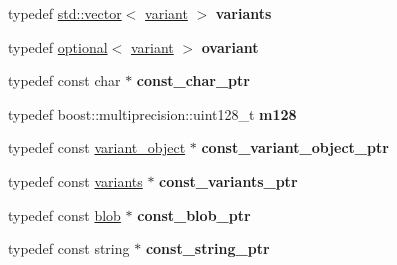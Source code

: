 \begin{DoxyCompactItemize}
\item 
\mbox{\label{namespacefc_a2e5e6bdb302dfb79e684336f3fbbd8bc}} 
typedef \mbox{\hyperlink{classstd_1_1vector}{std\+::vector}}$<$ \mbox{\hyperlink{classfc_1_1variant}{variant}} $>$ {\bfseries variants}
\item 
\mbox{\label{namespacefc_a19fe720f3bd477ddabfa64af0197880b}} 
typedef \mbox{\hyperlink{classfc_1_1optional}{optional}}$<$ \mbox{\hyperlink{classfc_1_1variant}{variant}} $>$ {\bfseries ovariant}
\item 
\mbox{\label{namespacefc_a0640ee6b17d8d5fca0013f9c753d7f6d}} 
typedef const char $\ast$ {\bfseries const\+\_\+char\+\_\+ptr}
\item 
\mbox{\label{namespacefc_a57627745fd3d6ca438159d665bea591e}} 
typedef boost\+::multiprecision\+::uint128\+\_\+t {\bfseries m128}
\item 
\mbox{\label{namespacefc_a1b3b274949f105f85361886e7a71c4b3}} 
typedef const \mbox{\hyperlink{classfc_1_1variant__object}{variant\+\_\+object}} $\ast$ {\bfseries const\+\_\+variant\+\_\+object\+\_\+ptr}
\item 
\mbox{\label{namespacefc_aadd61a2cdda27916a87e371eca11ca65}} 
typedef const \mbox{\hyperlink{classstd_1_1vector}{variants}} $\ast$ {\bfseries const\+\_\+variants\+\_\+ptr}
\item 
\mbox{\label{namespacefc_ad704d5db30b44013543e951d889ca437}} 
typedef const \mbox{\hyperlink{structfc_1_1blob}{blob}} $\ast$ {\bfseries const\+\_\+blob\+\_\+ptr}
\item 
\mbox{\label{namespacefc_a36d22c779fd1bc3b3635166055cb025f}} 
typedef const string $\ast$ {\bfseries const\+\_\+string\+\_\+ptr}
\end{DoxyCompactItemize}
